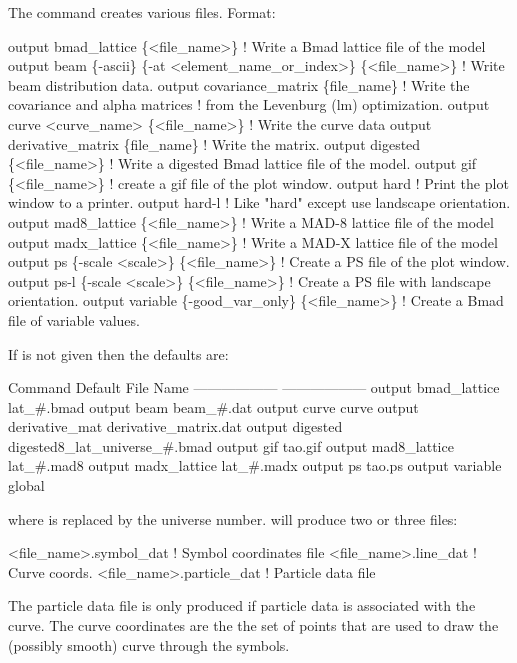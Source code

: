 The  command creates various files.
Format:
\begin{example}
  output bmad_lattice \{<file_name>\}       ! Write a Bmad lattice file of the model
  output beam \{-ascii\} \{-at <element_name_or_index>\} \{<file_name>\} 
                                          ! Write beam distribution data.
  output covariance_matrix \{file_name\}    ! Write the covariance and alpha matrices 
                                          !   from the Levenburg (lm) optimization.
  output curve <curve_name> \{<file_name>\} ! Write the curve data
  output derivative_matrix \{file_name\}    ! Write the  matrix.
  output digested \{<file_name>\}     ! Write a digested Bmad lattice file of the model.
  output gif \{<file_name>\}          ! create a gif file of the plot window.
  output hard                       ! Print the plot window to a printer.
  output hard-l                     ! Like "hard" except use landscape orientation. 
  output mad8_lattice \{<file_name>\} ! Write a MAD-8 lattice file of the model
  output madx_lattice \{<file_name>\} ! Write a MAD-X lattice file of the model
  output ps \{-scale <scale>\} \{<file_name>\}      
                                    ! Create a PS file of the plot window.
  output ps-l \{-scale <scale>\} \{<file_name>\}    
                                    ! Create a PS file with landscape orientation.
  output variable \{-good_var_only\} \{<file_name>\} 
                                    ! Create a Bmad file of variable values.
\end{example}

\vskip 0.2in 

If  is not given then the defaults are:
\begin{example}
  Command                         Default File Name
  ------------------              ------------------
  output bmad_lattice             lat_#.bmad
  output beam                     beam_#.dat
  output curve                    curve
  output derivative_mat           derivative_matrix.dat              
  output digested                 digested8_lat_universe_#.bmad
  output gif                      tao.gif
  output mad8_lattice             lat_#.mad8
  output madx_lattice             lat_#.madx
  output ps                       tao.ps
  output variable                 global%
\end{example}
where \vn{\#} is replaced by the universe number.  will produce two or three files: 
\begin{example}
  <file_name>.symbol_dat    ! Symbol coordinates file
  <file_name>.line_dat      ! Curve coords.
  <file_name>.particle_dat  ! Particle data file
\end{example}
The particle data file is only produced if particle
data is associated with the curve.
The curve coordinates are the the set of points that are used to draw the
(possibly smooth) curve through the symbols.

